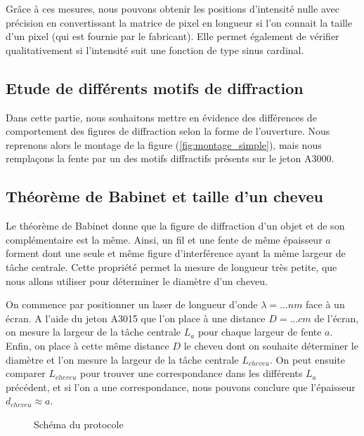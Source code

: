 \documentclass[12pt]{article}
\begin{document}
Grâce à ces mesures, nous pouvons obtenir les positions d'intensité nulle avec précision en convertissant la matrice de pixel en longueur si l'on connait la taille d'un pixel (qui est fournie par le fabricant).
Elle permet également de vérifier qualitativement si l'intensité suit une fonction de type sinus cardinal.

\subsection{Etude de différents motifs de diffraction}
Dans cette partie, nous souhaitons mettre en évidence des différences de comportement des figures de diffraction selon la forme de l'ouverture. 
Nous reprenons alors le montage de la figure (\ref{fig:montage_simple}), mais nous remplaçons la fente par un des motifs diffractifs présents sur le jeton A3000. 

\break
\subsection{Théorème de Babinet et taille d'un cheveu}
Le théorème de Babinet donne que la figure de diffraction d'un objet et de son complémentaire est la même.
Ainsi, un fil et une fente de même épaisseur $a$ forment dont une seule et même figure d'interférence ayant la même largeur de tâche centrale. Cette propriété permet la mesure de longueur très petite, que nous allons utiliser
pour déterminer le diamètre d'un cheveu.

On commence par positionner un laser de longueur d'onde $\lambda = \dots nm$ face à un écran. A l'aide du jeton A3015 que l'on place à une distance $D = \dots cm$ de
l'écran, on mesure la largeur de la tâche centrale $L_a$ pour chaque largeur de fente $a$. Enfin, on place à cette même distance $D$ le cheveu dont on souhaite déterminer
le diamètre et l'on mesure la largeur de la tâche centrale $L_{cheveu}$. On peut ensuite comparer $L_{cheveu}$ pour trouver une correspondance dans les différents $L_a$ précédent, et si l'on a une 
correspondance, nous pouvons conclure que l'épaisseur $d_{cheveu} \approx a$.

\begin{figure}[!h]
    \begin{center}
        \resizebox{0.7\textwidth}{8cm}{
        
        }
    \end{center}
    \caption{Schéma du protocole}
\end{figure}
\end{document}
